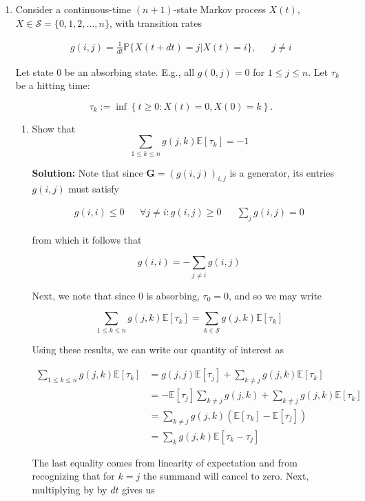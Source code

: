 \documentclass[12pt, a4paper]{article}
\begin{document}
\begin{enumerate}
    \item Consider a continuous-time $(n+1)$-state Markov process $X(t)$, $X \in \mathcal S = \{ 0,1,2,\dots, n \}$, with transition rates 
    
    \begin{align*}
        g(i,j) = \frac{1}{dt} \mathbb P \{ X(t+dt) = j|X(t)=i\}, && j \ne i
    \end{align*}

    Let state $0$ be an absorbing state. E.g., all $g(0,j)=0$ for $1 \le j \le n$. Let $\tau_k$ be a hitting time: 

    $$\tau_k := \inf \left\{ t \ge 0: X(t) = 0, X(0)=k \right\}.$$

    \begin{enumerate}
        \item Show that $$\sum_{1\le k \le n} g(j,k) \mathbb E[\tau_k] = -1$$

        \textbf{Solution:} Note that since $\mathbf G = (g(i,j))_{i,j}$ is a generator, its entries $g(i,j)$ must satisfy 

        \begin{align*}
            g(i,i) \le 0 && \forall j \ne i: g(i,j) \ge 0 && \sum_j g(i,j)=0
        \end{align*}

        from which it follows that 

        $$g(i,i) = - \sum_{j\ne i} g(i,j)$$

        Next, we note that since $0$ is absorbing, $\tau_0 = 0$, and so we may write
        
        $$\sum_{1\le k \le n} g(j,k) \mathbb E[\tau_k] = \sum_{k \in \mathcal S} g(j,k) \mathbb E[\tau_k] $$
        
        Using these results, we can write our quantity of interest as

        \begin{align*}
            \sum_{1 \le k\le n} g(j,k) \mathbb E[\tau_k] &= g(j,j)\mathbb E[\tau_j] + \sum_{k \ne j} g(j,k) \mathbb E[\tau_k]\\
            &= - \mathbb E[\tau_j] \sum_{k \ne j} g(j,k) + \sum_{k\ne j} g(j,k) \mathbb E[\tau_k] \\
            &= \sum_{k \ne j} g(j,k)\left( \mathbb E [\tau_k] - \mathbb E[\tau_j] \right)\\
            &=\sum_{k} g(j,k)\mathbb E [\tau_k-\tau_j]
        \end{align*}

        The last equality comes from linearity of expectation and from recognizing that for $k=j$ the summand will cancel to zero. Next, multiplying by by $dt$ gives us


\end{enumerate}
\end{enumerate}
\end{document}
